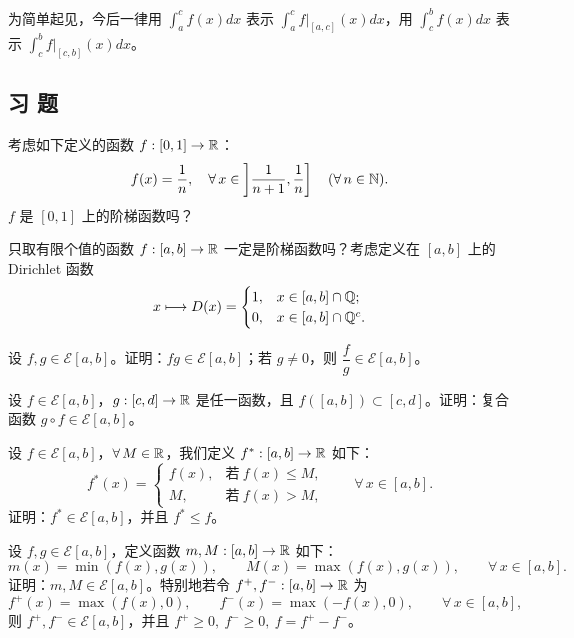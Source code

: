 为简单起见，今后一律用 \(\displaystyle\int_a^c f(x)dx\) 表示 \(\displaystyle\int_a^c f|_{[a,c]}(x)dx\)，用 \(\displaystyle\int_c^b f(x)dx\) 表示 \(\displaystyle\int_c^b f|_{[c,b]}(x)dx\)。

\subsection*{习 题}

\begin{exercise}
	\item 考虑如下定义的函数 \(f:[0,1]\to\mathbb{R}\)：
	\[
	f(x)=\frac1n,\quad \forall\,x\in\left]\frac1{n+1},\frac1n\right]\quad(\forall\,n\in\mathbb{N}).
	\]
	\(f\) 是 \([0,1]\) 上的阶梯函数吗？
\end{exercise}

\begin{exercise}
	\item 只取有限个值的函数 \(f:[a,b]\to\mathbb{R}\) 一定是阶梯函数吗？考虑定义在 \([a,b]\) 上的 Dirichlet 函数
	\[
	x\longmapsto D(x)=\begin{cases} 1, & x\in[a,b]\cap\mathbb{Q}; \\ 0, & x\in[a,b]\cap\mathbb{Q}^c. \end{cases}
	\]
\end{exercise}

\begin{exercise}
	\item 设 \(f,g\in\mathscr{E}[a,b]\)。证明：\(fg\in\mathscr{E}[a,b]\)；若 \(g\neq0\)，则 \(\dfrac fg\in\mathscr{E}[a,b]\)。
\end{exercise}

\begin{exercise}
	\item 设 \(f\in\mathscr{E}[a,b]\)，\(g:[c,d]\to\mathbb{R}\) 是任一函数，且 \(f([a,b])\subset[c,d]\)。证明：复合函数 \(g\circ f\in\mathscr{E}[a,b]\)。
\end{exercise}

\begin{exercise}
	\item 设 \(f\in\mathscr{E}[a,b]\)，\(\forall\,M\in\mathbb{R}\)，我们定义 \(f^*:[a,b]\to\mathbb{R}\) 如下：
	\[
	f^*(x)=\begin{cases} f(x), & \text{若}\ f(x)\le M, \\ M, & \text{若}\ f(x)>M, \end{cases}\qquad\forall\,x\in[a,b].
	\]
	证明：\(f^*\in\mathscr{E}[a,b]\)，并且 \(f^*\le f\)。
\end{exercise}

\begin{exercise}
	\item 设 \(f,g\in\mathscr{E}[a,b]\)，定义函数 \(m,M:[a,b]\to\mathbb{R}\) 如下：
	\[
	m(x)=\min(f(x),g(x)),\qquad M(x)=\max(f(x),g(x)),\qquad\forall\,x\in[a,b].
	\]
	证明：\(m,M\in\mathscr{E}[a,b]\)。特别地若令 \(f^+,f^-:[a,b]\to\mathbb{R}\) 为
	\[
	f^+(x)=\max(f(x),0),\qquad f^-(x)=\max(-f(x),0),\qquad\forall\,x\in[a,b],
	\]
	则 \(f^+,f^-\in\mathscr{E}[a,b]\)，并且 \(f^+\ge0,\ f^-\ge0,\ f=f^+-f^-\)。
\end{exercise}

